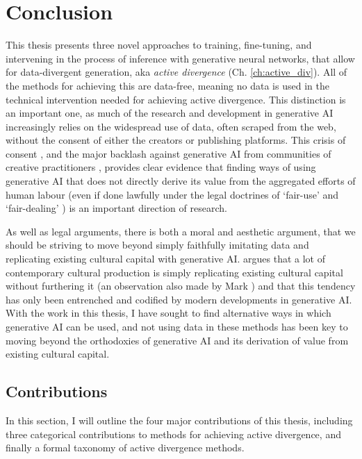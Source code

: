 \chapter{Conclusion}
\label{ch:conclusion}

This thesis presents three novel approaches to training, fine-tuning, and intervening in the process of inference with generative neural networks, that allow for data-divergent generation, aka \textit{active divergence} (Ch. \ref{ch:active_div}).
All of the methods for achieving this are data-free, meaning no data is used in the technical intervention needed for achieving active divergence.
This distinction is an important one, as much of the research and development in generative AI increasingly relies on the widespread use of data, often scraped from the web, without the consent of either the creators or publishing platforms.
This crisis of consent \citep{longpre2024consent}, and the major backlash against generative AI from communities of creative practitioners \citep{whiddington2022backlash}, provides clear evidence that finding ways of using generative AI that does not directly derive its value from the aggregated efforts of human labour (even if done lawfully under the legal doctrines of `fair-use' \citep{sobel2017artificial,alhadeff2024limits} and `fair-dealing' \citep{guadamuz2023scanner}) is an important direction of research.

As well as legal arguments, there is both a moral and aesthetic argument, that we should be striving to move beyond simply faithfully imitating data and replicating existing cultural capital with generative AI. 
\cite{rafferty2016future} argues that a lot of contemporary cultural production is simply replicating existing cultural capital without furthering it (an observation also made by Mark \cite{fisher2009capitalist}) and that this tendency has only been entrenched and codified by modern developments in generative AI.
With the work in this thesis, I have sought to find alternative ways in which generative AI can be used, and not using data in these methods has been key to moving beyond the orthodoxies of generative AI and its derivation of value from existing cultural capital.

\section{Contributions}

In this section, I will outline the four major contributions of this thesis, including three categorical contributions to methods for achieving active divergence, and finally a formal taxonomy of active divergence methods.

